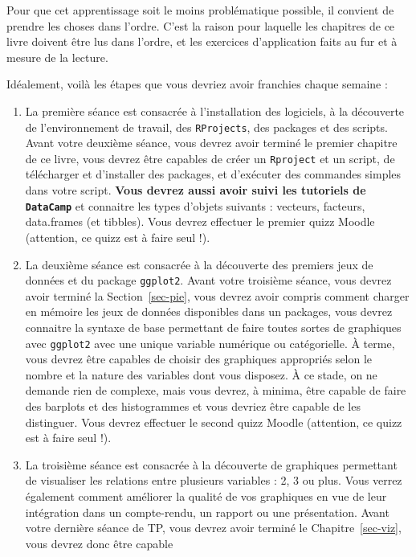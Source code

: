 \documentclass[
  a4paper,
  DIV=11,
  numbers=noendperiod,
  oneside]{scrreprt}
\begin{document}
Pour que cet apprentissage soit le moins problématique possible, il
convient de prendre les choses dans l'ordre. C'est la raison pour
laquelle les chapitres de ce livre doivent être lus dans l'ordre, et les
exercices d'application faits au fur et à mesure de la lecture.

Idéalement, voilà les étapes que vous devriez avoir franchies chaque
semaine :

\begin{enumerate}
\def\labelenumi{\arabic{enumi}.}
\item
  La première séance est consacrée à l'installation des logiciels, à la
  découverte de l'environnement de travail, des \texttt{RProjects}, des
  packages et des scripts. Avant votre deuxième séance, vous devrez
  avoir terminé le premier chapitre de ce livre, vous devrez être
  capables de créer un \texttt{Rproject} et un script, de télécharger et
  d'installer des packages, et d'exécuter des commandes simples dans
  votre script. \textbf{Vous devrez aussi avoir suivi les tutoriels de
  \texttt{DataCamp}} et connaitre les types d'objets suivants :
  vecteurs, facteurs, data.frames (et tibbles). Vous devrez effectuer le
  premier quizz Moodle (attention, ce quizz est à faire seul !).
\item
  La deuxième séance est consacrée à la découverte des premiers jeux de
  données et du package \texttt{ggplot2}. Avant votre troisième séance,
  vous devrez avoir terminé la Section~\ref{sec-pie}, vous devrez avoir
  compris comment charger en mémoire les jeux de données disponibles
  dans un packages, vous devrez connaitre la syntaxe de base permettant
  de faire toutes sortes de graphiques avec \texttt{ggplot2} avec une
  unique variable numérique ou catégorielle. À terme, vous devrez être
  capables de choisir des graphiques appropriés selon le nombre et la
  nature des variables dont vous disposez. À ce stade, on ne demande
  rien de complexe, mais vous devrez, à minima, être capable de faire
  des barplots et des histogrammes et vous devriez être capable de les
  distinguer. Vous devrez effectuer le second quizz Moodle (attention,
  ce quizz est à faire seul !).
\item
  La troisième séance est consacrée à la découverte de graphiques
  permettant de visualiser les relations entre plusieurs variables : 2,
  3 ou plus. Vous verrez également comment améliorer la qualité de vos
  graphiques en vue de leur intégration dans un compte-rendu, un rapport
  ou une présentation. Avant votre dernière séance de TP, vous devrez
  avoir terminé le Chapitre~\ref{sec-viz}, vous devrez donc être capable

\end{enumerate}
\end{document}
